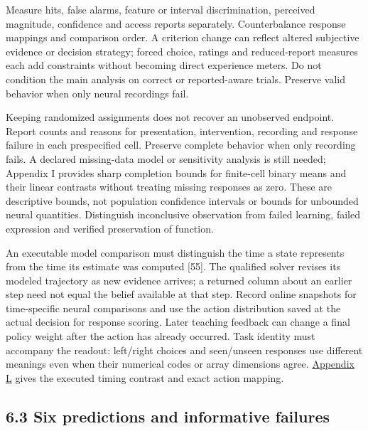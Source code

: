 \documentclass[
  american,
  11pt,
  letterpaper,
]{article}
\begin{document}
Measure hits, false alarms, feature or interval discrimination, perceived magnitude, confidence and access reports separately. Counterbalance response mappings and comparison order. A criterion change can reflect altered subjective evidence or decision strategy; forced choice, ratings and reduced-report measures each add constraints without becoming direct experience meters. Do not condition the main analysis on correct or reported-aware trials. Preserve valid behavior when only neural recordings fail.

Keeping randomized assignments does not recover an unobserved endpoint. Report counts and reasons for presentation, intervention, recording and response failure in each prespecified cell. Preserve complete behavior when only recording fails. A declared missing-data model or sensitivity analysis is still needed; Appendix I provides sharp completion bounds for finite-cell binary means and their linear contrasts without treating missing responses as zero. These are descriptive bounds, not population confidence intervals or bounds for unbounded neural quantities. Distinguish inconclusive observation from failed learning, failed expression and verified preservation of function.

An executable model comparison must distinguish the time a state represents from the time its estimate was computed {[}55{]}. The qualified solver revises its modeled trajectory as new evidence arrives; a returned column about an earlier step need not equal the belief available at that step. Record online snapshots for time-specific neural comparisons and use the action distribution saved at the actual decision for response scoring. Later teaching feedback can change a final policy weight after the action has already occurred. Task identity must accompany the readout: left/right choices and seen/unseen responses use different meanings even when their numerical codes or array dimensions agree. \href{https://zenodo.org/records/23509961/files/Learning-to-Feel-Technical-Supplement-v1.1.pdf\#appendix-l}{Appendix L} gives the executed timing contrast and exact action mapping.

\subsection{6.3 Six predictions and informative failures}\label{six-predictions-and-informative-failures}
\end{document}

